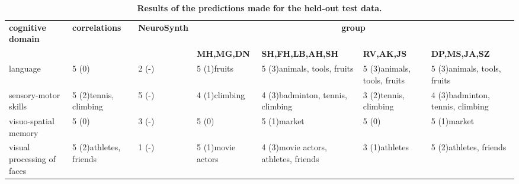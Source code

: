 \documentclass[fleqn,10pt]{SelfArx} %
\begin{document}
		
		\begin{table}[htbp]
			\scriptsize
			\centering
			\captionsetup{singlelinecheck = false, justification=justified}
			\caption{\bf Results of the predictions made for the held-out test data.}
			\begin{tabularx}{\textwidth}{XXXXXXX}
				\hline
				{\bf cognitive domain} & {\bf correlations} & {\bf NeuroSynth} & \multicolumn{4}{c}{{\bf group}} \\
				 & & &  {\bf MH,MG,DN} &		 {\bf SH,FH,LB,AH,SH} &	 {\bf RV,AK,JS} &		 {\bf DP,MS,JA,SZ} \\
				\hline
			
				language                  & 5 (0) & 2 (-) & 5 (1)\newline  fruits  & 5 (3)\newline animals, tools, fruits              & 5 (3)\newline animals, tools, fruits                &    5 (3)\newline  animals, tools, fruits  \\
				
				sensory-motor skills   & 5 (2)\newline tennis, climbing & 5 (-) &	4 (1)\newline climbing & 4 (3)\newline badminton, tennis, climbing  & 3 (2)\newline tennis, climbing  & 4 (3)\newline badminton, tennis, climbing \\
				
				visuo-spatial memory   & 5 (0) & 3 (-) &	5 (0)\newline          &	5 (1)\newline market	&        5 (0)\newline   	& 5 (1)\newline  market  \\	
				
				visual processing of faces	& 5 (2)\newline athletes, friends & 1 (-) &  5 (1)\newline movie actors & 4 (3)\newline  movie actors, athletes, friends & 3 (1)\newline  athletes 	& 5 (2)\newline athletes, friends \\
				

\end{tabularx}
\end{table}
\end{document}

